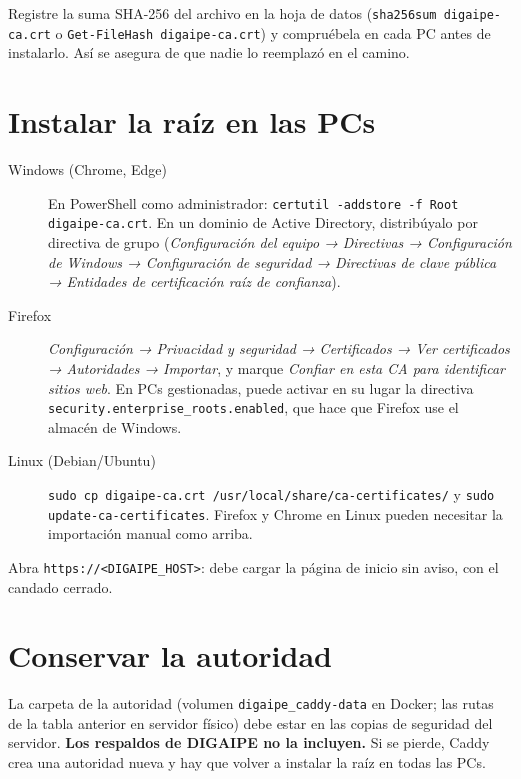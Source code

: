 Registre la suma SHA-256 del archivo en la hoja de datos
(\texttt{sha256sum digaipe-ca.crt} o \texttt{Get-FileHash digaipe-ca.crt}) y compruébela en cada
PC antes de instalarlo. Así se asegura de que nadie lo reemplazó en el camino.

\section{Instalar la raíz en las PCs}

\begin{description}
	\item[Windows (Chrome, Edge)] En PowerShell como administrador:
	      \texttt{certutil -addstore -f Root digaipe-ca.crt}. En un dominio de Active Directory,
	      distribúyalo por directiva de grupo (\emph{Configuración del equipo → Directivas →
		      Configuración de Windows → Configuración de seguridad → Directivas de clave pública →
		      Entidades de certificación raíz de confianza}).
	\item[Firefox] \emph{Configuración → Privacidad y seguridad → Certificados → Ver certificados →
		      Autoridades → Importar}, y marque \emph{Confiar en esta CA para identificar sitios web}.
	      En PCs gestionadas, puede activar en su lugar la directiva
	      \texttt{security.enterprise\_roots.enabled}, que hace que Firefox use el almacén de
	      Windows.
	\item[Linux (Debian/Ubuntu)] \texttt{sudo cp digaipe-ca.crt /usr/local/share/ca-certificates/}
	      y \texttt{sudo update-ca-certificates}. Firefox y Chrome en Linux pueden necesitar la
	      importación manual como arriba.
\end{description}

\begin{comprobar}
	Abra \texttt{https://<DIGAIPE\_HOST>}: debe cargar la página de inicio sin aviso, con el
	candado cerrado.
\end{comprobar}

\section{Conservar la autoridad}

La carpeta de la autoridad (volumen \texttt{digaipe\_caddy-data} en Docker; las rutas de la tabla
anterior en servidor físico) debe estar en las copias de seguridad del servidor. \textbf{Los
respaldos de DIGAIPE no la incluyen.} Si se pierde, Caddy crea una autoridad nueva y hay que
volver a instalar la raíz en todas las PCs.

